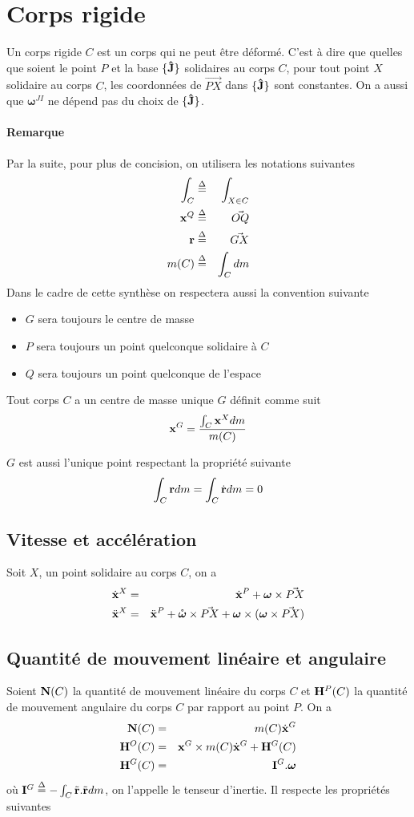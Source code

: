 \documentclass[11pt,a4paper]{article} %
\newcommand\fv[1]{{\bf #1}} %
\newcommand\fvd[1]{\dot{\bf #1}} %
\newcommand\fvdd[1]{\ddot{\bf #1}} %
\newcommand\uj{{\bf\hat{J}}} %
\newcommand\eqdef{\stackrel{\Delta}{=}}
\newcommand\omegaf{{\bm \omega}}
\newcommand\omegafr{\mathring{\bm \omega}}
\newcommand\ine{{\bf I}}
\newcommand\lm{{\bf N}}
\newcommand\am{{\bf H}}
\newcommand\xg{\fv{x}^G}
\newcommand\xgd{\fvd{x}^G}
\begin{document}
\section{Corps rigide}
Un corps rigide $C$ est un corps qui ne peut être déformé.
C'est à dire que quelles que soient le point $P$ et la base $\{\uj\}$ solidaires au corps $C$, pour tout point $X$ solidaire au corps $C$, les coordonnées de $\vec{PX}$ dans $\{\uj\}$ sont constantes.
On a aussi que $\omegaf^{JI}$ ne dépend pas du choix de $\{\uj\}$.

\paragraph{Remarque}
Par la suite, pour plus de concision, on utilisera les notations suivantes
\begin{eqnarray*}
	\int_C &\eqdef& \int_{X \in C}\\
	\fv{x}^Q &\eqdef& \vec{OQ}\\
	\fv{r} &\eqdef& \vec{GX}\\
	m(C) &\eqdef& \int_C dm
\end{eqnarray*}
Dans le cadre de cette synthèse on respectera aussi la convention suivante
\begin{itemize}
	\item $G$ sera toujours le centre de masse
	\item $P$ sera toujours un point quelconque solidaire à $C$
	\item $Q$ sera toujours un point quelconque de l'espace
\end{itemize}

Tout corps $C$ a un centre de masse unique $G$ définit comme suit
\[ \xg = \frac{\int_C \fv{x}^X dm}{m(C)} \]

$G$ est aussi l'unique point respectant la propriété suivante
\[ \int_C \fv{r} dm = \int_C \fvd{r} dm = 0 \]

\subsection{Vitesse et accélération}
Soit $X$, un point solidaire au corps $C$, on a
\begin{eqnarray*}
	\fvd{x}^X &=& \fvd{x}^P + \omegaf \times \vec{PX}\\
	\fvdd{x}^X &=& \fvdd{x}^P + \omegafr \times \vec{PX} + \omegaf \times (\omegaf \times \vec{PX})
\end{eqnarray*}

\subsection{Quantité de mouvement linéaire et angulaire}
Soient $\lm(C)$ la quantité de mouvement linéaire du corps $C$ et $\am^P(C)$ la quantité de mouvement angulaire du corps $C$ par rapport au point $P$.
On a
\begin{eqnarray*}
	\lm(C) &=& m(C) \xgd\\
	\am^O(C) &=& \xg \times m(C)\xgd + \am^G(C)\\
	\am^G(C) &=& \ine^G . \omegaf
\end{eqnarray*}
où $\ine^G \eqdef -\int_C \tilde{\fv{r}}.\tilde{\fv{r}} dm$, on l'appelle le tenseur d'inertie. Il respecte les propriétés suivantes
\end{document}

